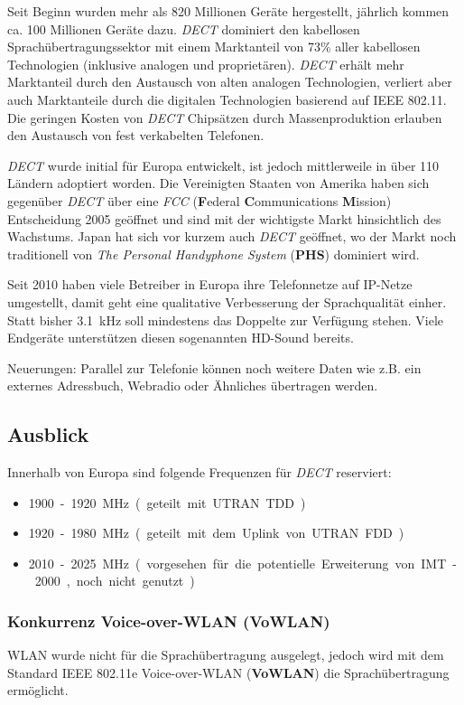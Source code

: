 \begin{multicols}{3}
Seit Beginn wurden mehr als 820 Millionen Geräte hergestellt, jährlich kommen ca. 100 Millionen Geräte dazu. \textit{DECT} dominiert den kabellosen Sprachübertragungssektor mit einem Marktanteil von 73\% aller kabellosen Technologien (inklusive analogen und proprietären). \textit{DECT} erhält mehr Marktanteil durch den Austausch von alten analogen Technologien, verliert aber auch Marktanteile durch die digitalen Technologien basierend auf IEEE 802.11. Die geringen Kosten von \textit{DECT} Chipsätzen durch Massenproduktion erlauben den Austausch von fest verkabelten Telefonen.

\textit{DECT} wurde initial für Europa entwickelt, ist jedoch mittlerweile in über 110 Ländern adoptiert worden. Die Vereinigten Staaten von Amerika haben sich gegenüber \textit{DECT} über eine \textit{FCC} (\textbf{F}ederal \textbf{C}ommunications \textbf{M}ission) Entscheidung 2005 geöffnet und sind mit der wichtigste Markt hinsichtlich des Wachstums. Japan hat sich vor kurzem auch \textit{DECT} geöffnet, wo der Markt noch traditionell von \textit{The Personal Handyphone System} (\textbf{PHS}) dominiert wird.

Seit 2010 haben viele Betreiber in Europa ihre Telefonnetze auf IP-Netze umgestellt, damit geht eine qualitative Verbesserung der Sprachqualität einher. Statt bisher \SI{3.1}{\kilo\hertz} soll mindestens das Doppelte zur Verfügung stehen. Viele Endgeräte unterstützen  diesen sogenannten HD-Sound bereits.

Neuerungen:
Parallel zur Telefonie können noch weitere Daten wie z.B. ein externes Adressbuch, Webradio oder Ähnliches übertragen werden.
\cite{dect.3,dect.5}
\subsection*{Ausblick}
Innerhalb von Europa sind folgende Frequenzen für \textit{DECT} reserviert:
\begin{itemize}
\item \SI{1900}-\SI{1920}{\mega\hertz} (geteilt mit UTRAN TDD)
\item \SI{1920}-\SI{1980}{\mega\hertz} (geteilt mit dem Uplink von UTRAN FDD)
\item \SI{2010}-\SI{2025}{\mega\hertz} (vorgesehen für die potentielle Erweiterung von IMT-2000, noch nicht genutzt)
\end{itemize} 

\subsubsection*{Konkurrenz Voice-over-WLAN (VoWLAN)}
WLAN wurde nicht für die Sprachübertragung ausgelegt, jedoch wird mit dem Standard IEEE 802.11e Voice-over-WLAN (\textbf{VoWLAN}) die Sprachübertragung ermöglicht.


\end{multicols}
